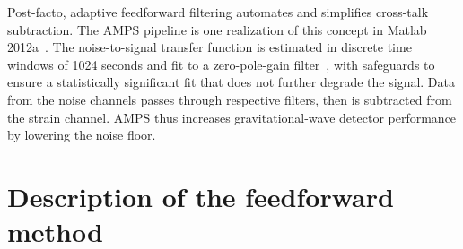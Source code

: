 Post-facto, adaptive feedforward filtering automates and simplifies cross-talk subtraction. The AMPS pipeline is one realization of this concept in Matlab 2012a~\cite{Matlab2012a}. The noise-to-signal transfer function is estimated in discrete time windows of 1024 seconds and fit to a zero-pole-gain filter~\cite{Deschrijver2008,Gustavsen1999,Gustavsen2006}, with safeguards to ensure a statistically significant fit that does not further degrade the signal. Data from the noise channels passes through respective filters, then is subtracted from the strain channel. AMPS thus increases gravitational-wave detector performance by lowering the noise floor.


    \section{Description of the feedforward method}
    \label{motive_math}



